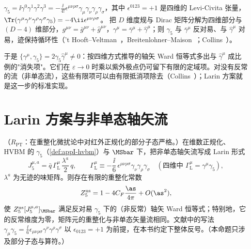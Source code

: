 \begin{definition}[HVBM 方案]\label{def:appI-hvbm}
$\gamma_5=\ii\gamma^0\gamma^1\gamma^2\gamma^3=-\frac{\ii}{4!}\epsilon^{\mu\nu\rho\sigma}\gamma_\mu\gamma_\nu\gamma_\rho\gamma_\sigma$，其中 $\epsilon^{0123}=+1$ 是四维的 Levi-Civita 张量，$\Tr(\gamma^\mu\gamma^\nu\gamma^\rho\gamma^\sigma\gamma_5)=-4\ii\epsilon^{\mu\nu\rho\sigma}$。%
把 $D$ 维度规与 Dirac 矩阵分解为四维部分与 $(D-4)$ 维部分，$g^{\mu\nu}=\bar g^{\mu\nu}+\hat g^{\mu\nu}$，$\gamma^\mu=\bar\gamma^\mu+\hat\gamma^\mu$；则 $\gamma_5$ 与 $\bar\gamma^\mu$ 反对易、与 $\hat\gamma^\mu$ 对易，迹保持循环性（'t Hooft--Veltman~\cite{tHooftVeltman1972}，Breitenlohner--Maison~\cite{BreitenlohnerMaison1977a}；Collins~\cite[第~13.2~节]{Collins1984}）。
\end{definition}

于是 $\{\gamma^\mu,\gamma_5\}=2\gamma_5\hat\gamma^\mu\ne0$：按四维方式推导的轴矢 Ward 恒等式多出与 $\hat\gamma^\mu$ 成比例的"消失项"。它们在 $\varepsilon\to0$ 时乘以紫外极点仍可留下有限的定域项。对没有反常的流（非单态流），这些有限项可以由有限抵消项除去（Collins~\cite[第~13.6~节]{Collins1984}）；Larin 方案就是这一步的标准实现。

\section{Larin 方案与非单态轴矢流}\label{sec:appI-larin}

\begin{proposition}\label{prop:appI-larin}
（$R_{\mathrm{PT}}$：在重整化微扰论中对红外正规化的部分子态严格。）在维数正规化、HVBM 的 $\gamma_5$（\cref{def:appI-hvbm}）与 $\MSbar$ 下，把非单态轴矢流写成 Larin 形式
\begin{equation}\label{eq:appI-larin-current}
J_5^{\mu,a}=\bar q\,\Gamma^\mu_{\mathrm L}\,\frac{\lambda^a}2\,q,\qquad \Gamma^\mu_{\mathrm L}\equiv-\frac{\ii}{6}\,\epsilon^{\mu\nu\rho\sigma}\gamma_\nu\gamma_\rho\gamma_\sigma\quad(\text{四维中 }\Gamma^\mu_{\mathrm L}=\gamma^\mu\gamma_5), %
\end{equation}
$\lambda^a$ 为无迹的味矩阵。则存在有限的重整化常数
\begin{equation}\label{eq:appI-Z5}
Z_5^{\mathrm{ns}}=1-4C_F\frac{\as}{4\pi}+O(\as^2), %
\end{equation}
使 $Z_5^{\mathrm{ns}}[J_5^{\mu,a}]_{\MSbar}$ 满足反对易 $\gamma_5$ 下的（非反常）轴矢 Ward 恒等式；特别地，它的反常维度为零，矩阵元的重整化与非单态矢量流相同。文献中的写法 $\gamma_\mu\gamma_5=\frac{\ii}6\epsilon_{\mu\nu\rho\sigma}\gamma^\nu\gamma^\rho\gamma^\sigma$ 以 $\epsilon_{0123}=+1$ 为前提，在本书约定下整体反号。（本命题只涉及部分子态与算符。）
\end{proposition}

